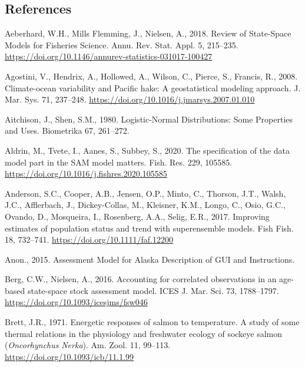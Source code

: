 \documentclass[]{article}
\begin{document}
\pagebreak

\hypertarget{references}{%
\subsection*{References}\label{references}}

\hypertarget{refs}{}
\leavevmode\hypertarget{ref-aeberhard2018Review}{}%
Aeberhard, W.H., Mills Flemming, J., Nielsen, A., 2018. Review of
State-Space Models for Fisheries Science. Annu. Rev. Stat. Appl. 5,
215--235. \url{https://doi.org/10.1146/annurev-statistics-031017-100427}

\leavevmode\hypertarget{ref-agostini2008Climateocean}{}%
Agostini, V., Hendrix, A., Hollowed, A., Wilson, C., Pierce, S.,
Francis, R., 2008. Climate-ocean variability and Pacific hake: A
geostatistical modeling approach. J. Mar. Sys. 71, 237--248.
\url{https://doi.org/10.1016/j.jmarsys.2007.01.010}

\leavevmode\hypertarget{ref-aitchison1980LogisticNormal}{}%
Aitchison, J., Shen, S.M., 1980. Logistic-Normal Distributions: Some
Properties and Uses. Biometrika 67, 261--272.

\leavevmode\hypertarget{ref-aldrin2020Specification}{}%
Aldrin, M., Tvete, I., Aanes, S., Subbey, S., 2020. The specification of
the data model part in the SAM model matters. Fish. Res. 229, 105585.
\url{https://doi.org/10.1016/j.fishres.2020.105585}

\leavevmode\hypertarget{ref-anderson2017Improving}{}%
Anderson, S.C., Cooper, A.B., Jensen, O.P., Minto, C., Thorson, J.T.,
Walsh, J.C., Afflerbach, J., Dickey-Collas, M., Kleisner, K.M., Longo,
C., Osio, G.C., Ovando, D., Mosqueira, I., Rosenberg, A.A., Selig, E.R.,
2017. Improving estimates of population status and trend with
superensemble models. Fish Fish. 18, 732--741.
\url{https://doi.org/10.1111/faf.12200}

\leavevmode\hypertarget{ref-anon.2015Assessment}{}%
Anon., 2015. Assessment Model for Alaska Description of GUI and
Instructions.

\leavevmode\hypertarget{ref-berg2016Accounting}{}%
Berg, C.W., Nielsen, A., 2016. Accounting for correlated observations in
an age-based state-space stock assessment model. ICES J. Mar. Sci. 73,
1788--1797. \url{https://doi.org/10.1093/icesjms/fsw046}

\leavevmode\hypertarget{ref-brett1971Energetic}{}%
Brett, J.R., 1971. Energetic responses of salmon to temperature. A study
of some thermal relations in the physiology and freshwater ecology of
sockeye salmon (\emph{Oncorhynchus} \emph{Nerka}). Am. Zool. 11,
99--113. \url{https://doi.org/10.1093/icb/11.1.99}
\end{document}
